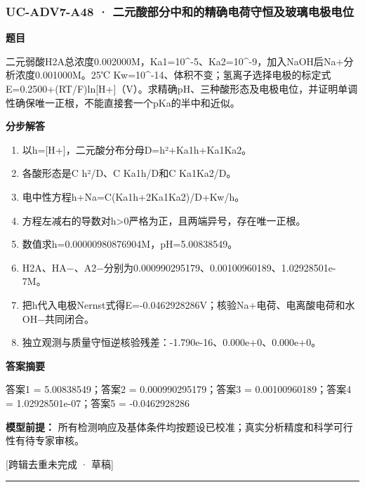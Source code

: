 \documentclass[UTF8,11pt,a4paper]{ctexart}
\begin{document}
\subsubsection*{UC-ADV7-A48 · 二元酸部分中和的精确电荷守恒及玻璃电极电位}
\noindent\textbf{题目}\par
二元弱酸H2A总浓度0.002000M，Ka1=10\textasciicircum{}-5、Ka2=10\textasciicircum{}-9，加入NaOH后Na+分析浓度0.001000M。25℃ Kw=10\textasciicircum{}-14、体积不变；氢离子选择电极的标定式E=0.2500+(RT/F)ln[H+]（V）。求精确pH、三种酸形态及电极电位，并证明单调性确保唯一正根，不能直接套一个pKa的半中和近似。\par
\medskip\noindent\textbf{分步解答}
\begin{enumerate}
\item 以h=[H+]，二元酸分布分母D=h²+Ka1h+Ka1Ka2。
\item 各酸形态是C h²/D、C Ka1h/D和C Ka1Ka2/D。
\item 电中性方程h+Na=C(Ka1h+2Ka1Ka2)/D+Kw/h。
\item 方程左减右的导数对h>0严格为正，且两端异号，存在唯一正根。
\item 数值求h=0.00000980876904M，pH=5.00838549。
\item H2A、HA−、A2−分别为0.000990295179、0.00100960189、1.02928501e-7M。
\item 把h代入电极Nernst式得E=-0.0462928286V；核验Na+电荷、电离酸电荷和水OH−共同闭合。
\item 独立观测与质量守恒逆核验残差：-1.790e-16、0.000e+0、0.000e+0。
\end{enumerate}
\noindent\textbf{答案摘要}\par
答案1 = 5.00838549；答案2 = 0.000990295179；答案3 = 0.00100960189；答案4 = 1.02928501e-07；答案5 = -0.0462928286\par
\noindent\textbf{模型前提：}
所有检测响应及基体条件均按题设已校准；真实分析精度和科学可行性有待专家审核。\par
\noindent\textcolor{red!65!black}{[跨辑去重未完成 · 草稿]} \par
\medskip\hrule\medskip
{}
\end{document}
